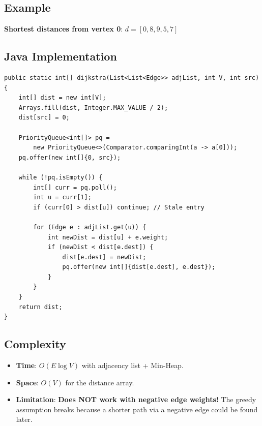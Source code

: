\documentclass[12pt,a4paper]{article}
\begin{document}
\subsection{Example}

\begin{center}
\end{center}

\textbf{Shortest distances from vertex 0}: $d = [0, 8, 9, 5, 7]$

\subsection{Java Implementation}
\begin{lstlisting}[style=javastyle, caption={Dijkstra's Algorithm — Java}]
public static int[] dijkstra(List<List<Edge>> adjList, int V, int src) {
    int[] dist = new int[V];
    Arrays.fill(dist, Integer.MAX_VALUE / 2);
    dist[src] = 0;

    PriorityQueue<int[]> pq =
        new PriorityQueue<>(Comparator.comparingInt(a -> a[0]));
    pq.offer(new int[]{0, src});

    while (!pq.isEmpty()) {
        int[] curr = pq.poll();
        int u = curr[1];
        if (curr[0] > dist[u]) continue; // Stale entry

        for (Edge e : adjList.get(u)) {
            int newDist = dist[u] + e.weight;
            if (newDist < dist[e.dest]) {
                dist[e.dest] = newDist;
                pq.offer(new int[]{dist[e.dest], e.dest});
            }
        }
    }
    return dist;
}
\end{lstlisting}

\subsection{Complexity}
\begin{itemize}
    \item \textbf{Time}: $O(E \log V)$ with adjacency list + Min-Heap.
    \item \textbf{Space}: $O(V)$ for the distance array.
    \item \textbf{Limitation}: \textcolor{negativered}{\textbf{Does NOT work with negative edge weights!}} The greedy assumption breaks because a shorter path via a negative edge could be found later.
\end{itemize}
\end{document}
